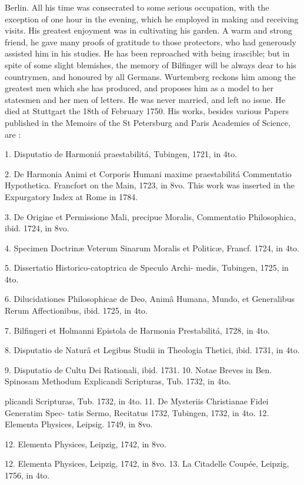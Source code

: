 \documentclass{article}
\begin{document}
Berlin. All his time was consecrated to some serious occupation, with the exception of one hour in the evening, which he employed in making and receiving visits. His greatest enjoyment was in cultivating his garden. A warm and strong friend, he gave many proofs of gratitude to those protectors, who had generously assisted him in his studies. He has been reproached with being irascible; but in spite of some slight blemishes, the memory of Bilfinger will be always dear to his countrymen, and honoured by all Germans. Wurtemberg reckons him among the greatest men which she has produced, and proposes him as a model to her statesmen and her men of letters. He was never married, and left no issue. He died at Stuttgart the 18th of February 1750. His works, besides various Papers published in the Memoirs of the St Petersburg and Paris Academies of Science, are :

1. Disputatio de Harmoniá praestabilitá, Tubingen, 1721, in 4to.

2. De Harmonia Animi et Corporis Humani maxime praestabilitá Commentatio Hypothetica. Francfort on the Main, 1723, in 8vo. This work was inserted in the Expurgatory Index at Rome in 1784.

3. De Origine et Permissione Mali, precipue Moralis, Commentatio Philosophica, ibid. 1724, in 8vo.

4. Specimen Doctrinæ Veterum Sinarum Moralis et Politicæ, Francf. 1724, in 4to.

5. Dissertatio Historico-catoptrica de Speculo Archi-
medis, Tubingen, 1725, in 4to.

6. Dilucidationes Philosophicae de Deo, Animâ Humana, Mundo, et Generalibus Rerum Affectionibus, ibid. 1725, in 4to.

7. Bilfingeri et Holmanni Epistola de Harmonia Prestabilitá, 1728, in 4to.

8. Disputatio de Naturâ et Legibus Studii in Theologia Thetici, ibid. 1731, in 4to.

9. Disputatio de Cultu Dei Rationali, ibid. 1731.
10. Notae Breves in Ben. Spinosam Methodum Explicandi Scripturas, Tub. 1732, in 4to.

plicandi Scripturas, Tub. 1732, in 4to.
11. De Mysteriis Christianae Fidei Generatim Spec-
tatis Sermo, Recitatus 1732, Tubingen, 1732, in 4to.
12. Elementa Physices, Leipsig. 1749, in 8vo.

12. Elementa Physices, Leipzig, 1742, in 8vo.

12. Elementa Physices, Leipzig, 1742, in 8vo.
13. La Citadelle Coupée, Leipzig, 1756, in 4to.
\end{document}
